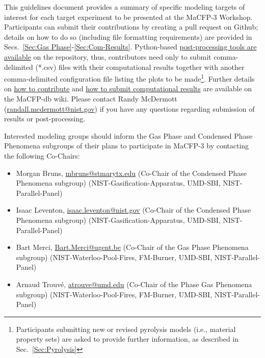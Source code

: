 \documentclass[12pt]{article}
\begin{document}
This guidelines document provides a summary of specific modeling targets of interest for each target experiment to be presented at the MaCFP-3 Workshop. Participants can submit their contributions by creating a pull request on Github; details on how to do so (including file formatting requirements) are provided in Secs.~\ref{Sec:Gas Phase}-\ref{Sec:Com-Results}. Python-based \href{https://github.com/MaCFP/macfp-db/wiki/Plotting-Scripts}{post-processing tools are available} on the repository, thus, contributors need only to submit comma-delimited (*.csv) files with their computational results together with another comma-delimited configuration file listing the plots to be made\footnote{Participants submitting new or revised pyrolysis models (i.e., material property sets) are asked to provide further information, as described in Sec.~\ref{Sec:Pyrolysis}}. Further details on \href{https://github.com/MaCFP/macfp-db/wiki/How-to-Contribute}{how to contribute} and \href{https://github.com/MaCFP/macfp-db/wiki/Submitting-Computational-Results}{how to submit computational results} are available on the MaCFP-db wiki.  Please contact Randy McDermott (\href{mailto:randall.mcdermott@nist.gov}{randall.mcdermott@nist.gov}) if you have any questions regarding submission of results or post-processing.

\newpage
Interested modeling groups should inform the Gas Phase and Condensed Phase Phenomena subgroups of their plans to participate in MaCFP-3 by contacting the following Co-Chairs:

\begin{itemize}[noitemsep]
\item Morgan Bruns, \href{mailto:mbruns@stmarytx.edu}{mbruns@stmarytx.edu} (Co-Chair of the Condensed Phase Phenomena subgroup) (NIST-Gasification-Apparatus, UMD-SBI, NIST-Parallel-Panel)
\item Isaac Leventon, \href{mailto:isaac.leventon@nist.gov}{isaac.leventon@nist.gov} (Co-Chair of the Condensed Phase Phenomena subgroup) (NIST-Gasification-Apparatus, UMD-SBI, NIST-Parallel-Panel)
\item Bart Merci, \href{mailto:Bart.Merci@ugent.be}{Bart.Merci@ugent.be} (Co-Chair of the Gas Phase Phenomena subgroup) (NIST-Waterloo-Pool-Fires, FM-Burner, UMD-SBI, NIST-Parallel-Panel)
\item Arnaud Trouv\'e, \href{mailto:atrouve@umd.edu}{atrouve@umd.edu} (Co-Chair of the Phase Gas Phenomena subgroup) (NIST-Waterloo-Pool-Fires, FM-Burner, UMD-SBI, NIST-Parallel-Panel)
 \end{itemize}
\end{document}
